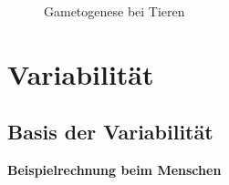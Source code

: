 \begin{figure}[H]
    \caption{Gametogenese bei Tieren}
\end{figure}

\section{Variabilität}




\subsection{Basis der Variabilität}


\begin{bsp}
    \textbf{Beispielrechnung beim Menschen}
\end{bsp}